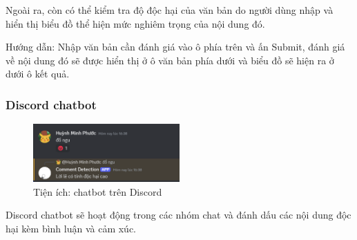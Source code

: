 Ngoài ra, còn có thể kiểm tra độ độc hại của văn bản do người dùng nhập và hiển thị biểu đồ thể hiện mức nghiêm trọng của nội dung đó.

Hướng dẫn: Nhập văn bản cần đánh giá vào ô phía trên và ấn Submit, đánh giá về nội dung đó sẽ được hiển thị ở ô văn bản phía dưới và biểu đồ sẽ hiện ra ở dưới ô kết quả.

\subsubsection{Discord chatbot}
\begin{figure}[htb]
    \centering
    \includegraphics[width=0.5\textwidth]{image/bot_discord.png}
    \caption{Tiện ích: chatbot trên Discord}
    \label{figure:bot_discord}
\end{figure}

Discord chatbot sẽ hoạt động trong các nhóm chat và đánh dấu các nội dung độc hại kèm bình luận và cảm xúc.